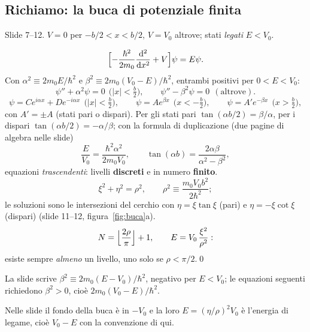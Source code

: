 \documentclass[11pt,a4paper]{article}
\begin{document}
\subsection{Richiamo: la buca di potenziale finita}\label{sec:buca}
Slide 7--12. $V=0$ per $-b/2<x<b/2$, $V=V_0$ altrove; stati \emph{legati} $E<V_0$.
\begin{dimostrazione}
\[
\Bigl[-\frac{\hbar^2}{2m_0}\frac{\mathrm d^2}{\mathrm d x^2}+V\Bigr]\psi=E\psi .
\]
Con $\alpha^2\equiv2m_0E/\hbar^2$ e $\beta^2\equiv2m_0(V_0-E)/\hbar^2$, entrambi positivi per $0<E<V_0$:
\[
\psi''+\alpha^2\psi=0\ \ \bigl(|x|<\tfrac b2\bigr),\qquad \psi''-\beta^2\psi=0\ \ (\text{altrove}).
\]
\[
\psi=Ce^{i\alpha x}+De^{-i\alpha x}\ \ \bigl(|x|<\tfrac b2\bigr),\qquad
\psi=Ae^{\beta x}\ \ \bigl(x<-\tfrac b2\bigr),\qquad \psi=A'e^{-\beta x}\ \ \bigl(x>\tfrac b2\bigr),
\]
con $A'=\pm A$ (stati pari o dispari).
Per gli stati pari $\tan(\alpha b/2)=\beta/\alpha$, per i dispari $\tan(\alpha b/2)=-\alpha/\beta$; con la formula di duplicazione (due pagine di algebra nelle slide)
\[
\frac{E}{V_0}=\frac{\hbar^2\alpha^2}{2m_0V_0},\qquad
\tan(\alpha b)=\frac{2\alpha\beta}{\alpha^2-\beta^2},
\]
equazioni \emph{trascendenti}: livelli \textbf{discreti} e in numero \textbf{finito}.
\[
\xi^2+\eta^2=\rho^2,\qquad \rho^2\equiv\frac{m_0V_0b^2}{2\hbar^2};
\]
le soluzioni sono le intersezioni del cerchio con $\eta=\xi\tan\xi$ (pari) e $\eta=-\xi\cot\xi$ (dispari) (slide 11--12, figura~\ref{fig:buca}a).
\[
N=\Bigl\lfloor\frac{2\rho}{\pi}\Bigr\rfloor+1,\qquad E=V_0\,\frac{\xi^2}{\rho^2}:
\]
esiste sempre \emph{almeno} un livello, uno solo se $\rho<\pi/2$.\qed
\end{dimostrazione}

\begin{osservazione}
La slide scrive $\beta^2\equiv2m_0(E-V_0)/\hbar^2$, negativo per $E<V_0$; le equazioni seguenti richiedono $\beta^2>0$, cioè $2m_0(V_0-E)/\hbar^2$.
\end{osservazione}
\begin{osservazione}
Nelle slide il fondo della buca è in $-V_0$ e la loro $E=(\eta/\rho)^2V_0$ è l'energia di legame, cioè $V_0-E$ con la convenzione di qui.
\end{osservazione}
\end{document}
